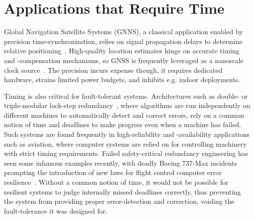 
\section{Applications that Require Time}
\label{sec:motivation}

Global Navigation Satellite Systems (GNNS), a classical application enabled by precision time-synchronization, relies on signal propagation delays to determine relative positioning~\cite{intro-to-gnss}.
High-quality location estimates hinge on accurate timing and -compensation mechanisms, so GNSS is frequently leveraged as a nanoscale clock source~\cite{gnss-location-and-time-advances,gnss-for-high-precision-timing}.
The precision incurs expense though, it requires dedicated hardware, strains limited power budgets, and inhibits e.g. indoor deployments.

Timing is also critical for fault-tolerant systems. Architectures such as double- or triple-modular lock-step redundancy~\cite{triple-modular-redundancy,triple-modular-redundancy-evaluation,triple-modular-lock-step-arm}, where algorithms are run independently on different machines to automatically detect and correct errors, rely on a common notion of time and deadlines to make progress even when a machine has failed. Such systems are found frequently in high-reliability and -availability applications such as aviation, where computer systems are relied on for controlling machinery with strict timing requirements. Failed safety-critical redundancy engineering has seen some infamous examples recently, with deadly Boeing 737-Max incidents prompting the introduction of new laws for flight control computer error resilience~\cite{boeing-requirements}. Without a common notion of time, it would not be possible for resilient systems to judge internally missed deadlines correctly, thus preventing the system from providing proper error-detection and correction, voiding the fault-tolerance it was designed for.

